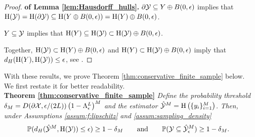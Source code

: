 \documentclass[12pt]{l4dc2022} %
\begin{document}
\begin{proof}\textbf{of Lemma \ref{lem:Hausdorff_hulls}.} 
$\partial\mathcal{Y}\subseteq Y\oplus B(0,\epsilon)$ implies that $\textrm{H}(\mathcal{Y})=\textrm{H}(\partial\mathcal{Y})\subseteq \textrm{H}(Y\oplus B(0,\epsilon))=\textrm{H}(Y)\oplus B(0,\epsilon)$.

$Y\subseteq \mathcal{Y}$ implies %
that 
$\textrm{H}(Y)\subseteq \textrm{H}(\mathcal{Y})\subset\textrm{H}(\mathcal{Y})\oplus B(0,\epsilon)$.%
% 
% 
% 
% 

Together, 
$\textrm{H}(\mathcal{Y})\subset\textrm{H}(Y)\oplus B(0,\epsilon)$
and $\textrm{H}(Y)\subset\textrm{H}(\mathcal{Y})\oplus B(0,\epsilon)$
imply that $d_H(
\textrm{H}(Y), 
\textrm{H}(\mathcal{Y})
)\leq \epsilon$, see \citep{Schneider2014}.
\end{proof}

% 

With these results, we prove Theorem \ref{thm:conservative_finite_sample} below. We first restate it for better readability.
\\[2mm]
% 
\textbf{Theorem \ref{thm:conservative_finite_sample}} 
 \textit{Define the probability threshold
$
\delta_M= 
D(\partial\mathcal{X},\epsilon/(2L))\left(1 -
	\Lambda_{\epsilon}^{L}
\right)^M
$ and the estimator $\hat{\mathcal{Y}}^M=\textrm{H}\left(\{y_i\}_{i{=}1}^M\right)$.
% 
Then, under Assumptions \ref{assum:f:lipschitz} and \ref{assum:sampling_density} 
$$
\mathbb{P}(
d_H(
\hat{\mathcal{Y}}^M, 
\textrm{H}(\mathcal{Y})
)\leq \epsilon
)\geq 1-\delta_M
\qquad\text{and}\qquad
\mathbb{P}(\mathcal{Y}\subseteq\hat{\mathcal{Y}}_\epsilon^M)\geq 1-\delta_M.
$$}
\\
\end{document}
